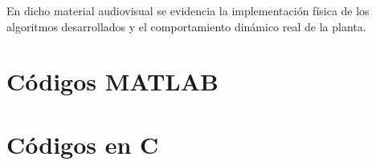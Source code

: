 En dicho material audiovisual se evidencia la implementación física
de los algoritmos desarrollados y el comportamiento dinámico real de la planta.

\section{Códigos  MATLAB}






\section{Códigos en C}

\twocolumn



